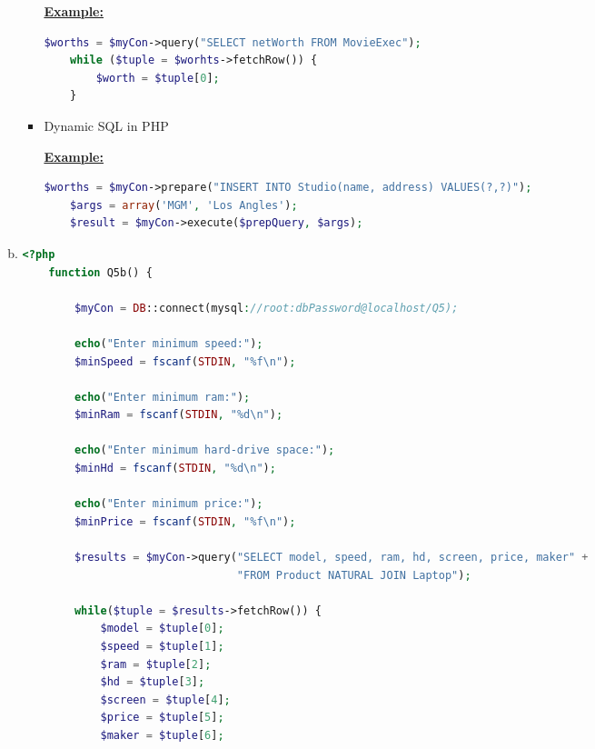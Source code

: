 \documentclass[12pt]{article}
\begin{document}
\begin{enumerate}[1.]
\begin{enumerate}[a)]
\begin{itemize}
            \bigskip

            \underline{\textbf{Example:}}

            \bigskip

    \begin{lstlisting}[language=PHP]
    $worths = $myCon->query("SELECT netWorth FROM MovieExec");
    while ($tuple = $worhts->fetchRow()) {
        $worth = $tuple[0];
    }
    \end{lstlisting}

            \item Dynamic SQL in PHP

            \bigskip

            \underline{\textbf{Example:}}

            \bigskip

    \begin{lstlisting}[language=PHP]
    $worths = $myCon->prepare("INSERT INTO Studio(name, address) VALUES(?,?)");
    $args = array('MGM', 'Los Angles');
    $result = $myCon->execute($prepQuery, $args);
    \end{lstlisting}

        \end{itemize}

        \item

    \begin{lstlisting}[language=PHP]
    <?php
    function Q5b() {

        $myCon = DB::connect(mysql://root:dbPassword@localhost/Q5);

        echo("Enter minimum speed:");
        $minSpeed = fscanf(STDIN, "%f\n");

        echo("Enter minimum ram:");
        $minRam = fscanf(STDIN, "%d\n");

        echo("Enter minimum hard-drive space:");
        $minHd = fscanf(STDIN, "%d\n");

        echo("Enter minimum price:");
        $minPrice = fscanf(STDIN, "%f\n");

        $results = $myCon->query("SELECT model, speed, ram, hd, screen, price, maker" +
                                 "FROM Product NATURAL JOIN Laptop");

        while($tuple = $results->fetchRow()) {
            $model = $tuple[0];
            $speed = $tuple[1];
            $ram = $tuple[2];
            $hd = $tuple[3];
            $screen = $tuple[4];
            $price = $tuple[5];
            $maker = $tuple[6];


\end{lstlisting}
\end{enumerate}
\end{enumerate}
\end{document}
